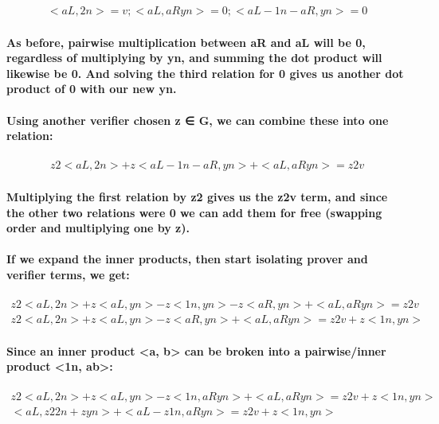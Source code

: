\documentclass{article}
\begin{document}
\begin{eqnarray}
  <aL, 2n> = v ; <aL,  aRyn> = 0 ; <aL - 1n - aR, yn> = 0
\end{eqnarray}

\paragraph{As before, pairwise multiplication between aR and aL will be 0, regardless of multiplying by yn, and summing the dot product will likewise be 0. And solving the third relation for 0 gives us another dot product of 0 with our new yn.}

\paragraph{Using another verifier chosen z ∈ G, we can combine these into one relation:}

\begin{eqnarray}
  z2 <aL, 2n> + z <aL - 1n - aR, yn> + <aL,  aRyn> = z2 v
\end{eqnarray}

\paragraph{Multiplying the first relation by z2 gives us the z2v term, and since the other two relations were 0 we can add them for free (swapping order and multiplying one by z).}

\paragraph{If we expand the inner products, then start isolating prover and verifier terms, we get:}

\begin{eqnarray}
  z2 <aL, 2n> + z <aL, yn> - z <1n, yn> - z <aR, yn> + <aL,  aRyn> = z2 v\\
  z2 <aL, 2n> + z <aL, yn> - z <aR, yn> + <aL,  aRyn> = z2 v + z <1n, yn>
\end{eqnarray}

\paragraph{Since an inner product <a, b> can be broken into a pairwise/inner product <1n, ab>:}

\begin{eqnarray}
  z2 <aL, 2n> + z <aL, yn> - z <1n, aRyn> + <aL,  aRyn> = z2 v + z <1n, yn>\\
  <aL, z2 2n + z yn> + <aL - z 1n, aRyn> = z2 v + z <1n, yn>
\end{eqnarray}
\end{document}
